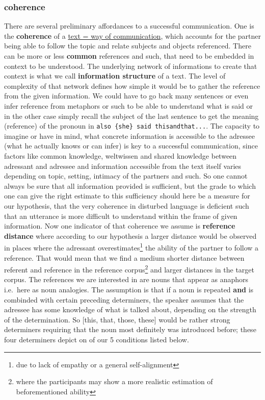 \documentclass[
]{article}
\begin{document}
\subsubsection{coherence}\label{coherence}

There are several preliminary affordances to a successful communication. One is the \textbf{coherence} of a \hyperref[]{text = way of communication}, which accounts for the partner being able to follow the topic and relate subjects and objects referenced. There can be more or less \textbf{common} references and such, that need to be embedded in context to be understood. The underlying network of informations to create that context is what we call \textbf{information structure} of a text. The level of complexity of that network defines how simple it would be to gather the reference from the given information. We could have to go back many sentences or even infer reference from metaphors or such to be able to understand what is said or in the other case simply recall the subject of the last sentence to get the meaning (reference) of the pronoun in \texttt{also\ \{she\}\ said\ thisandthat...}.
The capacity to imagine or have in mind, what concrete information is accessible to the adressee (what he actually knows or can infer) is key to a successful communication, since factors like common knowledge, weltwissen and shared knowledge between adressant and adressee and information accessible from the text itself varies depending on topic, setting, intimacy of the partners and such. So one cannot always be sure that all information provided is sufficient, but the grade to which one can give the right estimate to this sufficiency should here be a measure for our hypothesis, that the very coherence in disturbed language is deficient such that an utterance is more difficult to understand within the frame of given information.
Now one indicator of that coherence we assume is \textbf{reference distance} where according to our hypothesis a larger distance would be observed in places where the adressant overestimates\footnote{due to lack of empathy or a general self-alignment} the ability of the partner to follow a reference. That would mean that we find a medium shorter distance between referent and reference in the reference corpus\footnote{where the participants may show a more realistic estimation of beforementioned ability} and larger distances in the target corpus. The references we are interested in are nouns that appear as anaphors i.e.~here as noun analogies. The assumption is that if a noun is repeated \textbf{and} is combinded with certain preceding determiners, the speaker assumes that the adressee has some knowledge of what is talked about, depending on the strength of the determination. So {[}this, that, those, these{]} would be rather strong determiners requiring that the noun most definitely was introduced before; these four determiners depict on of our 5 conditions listed below.
\end{document}

